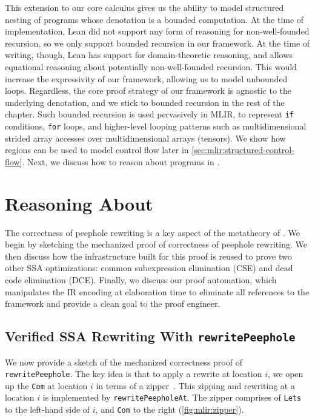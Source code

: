 This extension to our core calculus gives us the ability to model structured nesting of programs whose denotation is a bounded computation.
At the time of implementation, Lean did not support any form of reasoning for non-well-founded recursion,
so we only support bounded recursion in our framework.
At the time of writing, though, Lean has support for domain-theoretic reasoning,
and allows equational reasoning about potentially non-well-founded recursion.
This would increase the expressivity of our framework, allowing us to model unbounded loops.
Regardless, the core proof strategy of our framework is agnostic to the underlying denotation, 
and we stick to bounded recursion in the rest of the chapter.
Such bounded recursion is used pervasively in MLIR, to represent \texttt{if} conditions, \texttt{for} loops,
and higher-level looping patterns such as multidimensional strided array accesses over multidimensional arrays (tensors).
We show how regions can be used to model control flow later in \cref{sec:mlir:structured-control-flow}.
Next, we discuss how to reason about programs in .

\section{Reasoning About \texorpdfstring{}{LeanMLIR(X)}}
\label{sec:mlir:reasoning}

The correctness of peephole rewriting is a key aspect of the metatheory of .
We begin by sketching the mechanized proof of correctness of peephole rewriting.
We then discuss how the infrastructure built for this proof is reused to prove two other SSA optimizations:
common subexpression elimination (CSE) and dead code elimination (DCE).
Finally, we discuss our proof automation,
which manipulates the IR encoding at elaboration time to eliminate all references to the framework and provide a clean goal to the proof engineer.

\subsection{Verified SSA Rewriting With \texttt{rewritePeephole}}
\label{sec:mlir:verified-rewriting}

{\sloppypar
We now provide a sketch of the mechanized correctness proof of \texttt{rewritePeephole}.
The key idea is that to apply a rewrite at location $i$, we open up the \texttt{Com} at location $i$ in terms of a zipper~\cite{huet1997zipper}.
This zipping and rewriting at a location $i$ is implemented by \texttt{rewritePeepholeAt}.
The zipper comprises of \texttt{Lets} to the left-hand side of $i$, and \texttt{Com} to the right (\cref{fig:mlir:zipper}).}

